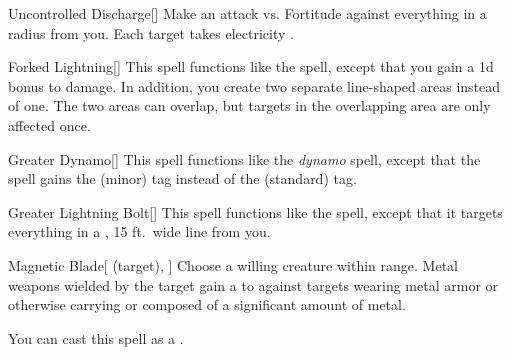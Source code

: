 \lowercase{\hypertarget{spell:Uncontrolled Discharge}{}}\label{spell:Uncontrolled Discharge}
\begin{freeability}[\nth{2}]{\hypertarget{spell:Uncontrolled Discharge}{Uncontrolled Discharge}}[]
Make an attack vs. Fortitude against everything in a \areamed radius from you.
\hit Each target takes electricity .
\end{freeability}
\vspace{0.25em}



\lowercase{\hypertarget{spell:Forked Lightning}{}}\label{spell:Forked Lightning}
\begin{freeability}[\nth{3}]{\hypertarget{spell:Forked Lightning}{Forked Lightning}}[]
This spell functions like the  spell, except that you gain a \plus1d bonus to damage.
In addition, you create two separate line-shaped areas instead of one.
The two areas can overlap, but targets in the overlapping area are only affected once.
\end{freeability}
\vspace{0.25em}



\lowercase{\hypertarget{spell:Greater Dynamo}{}}\label{spell:Greater Dynamo}
\begin{freeability}[\nth{3}]{\hypertarget{spell:Greater Dynamo}{Greater Dynamo}}[]
This spell functions like the \textit{dynamo} spell, except that the spell gains the  (minor) tag instead of the  (standard) tag.
\end{freeability}
\vspace{0.25em}



\lowercase{\hypertarget{spell:Greater Lightning Bolt}{}}\label{spell:Greater Lightning Bolt}
\begin{freeability}[\nth{3}]{\hypertarget{spell:Greater Lightning Bolt}{Greater Lightning Bolt}}[]
This spell functions like the  spell, except that it targets everything in a \arealarge, 15 ft.\ wide line from you.
\end{freeability}
\vspace{0.25em}



\lowercase{\hypertarget{spell:Magnetic Blade}{}}\label{spell:Magnetic Blade}
\begin{attuneability}[\nth{3}]{\hypertarget{spell:Magnetic Blade}{Magnetic Blade}}[ (target), ]
Choose a willing creature within \rngclose range.
Metal weapons wielded by the target gain a   to  against targets wearing metal armor or otherwise carrying or composed of a significant amount of metal.

You can cast this spell as a .
\end{attuneability}
\vspace{0.25em}



